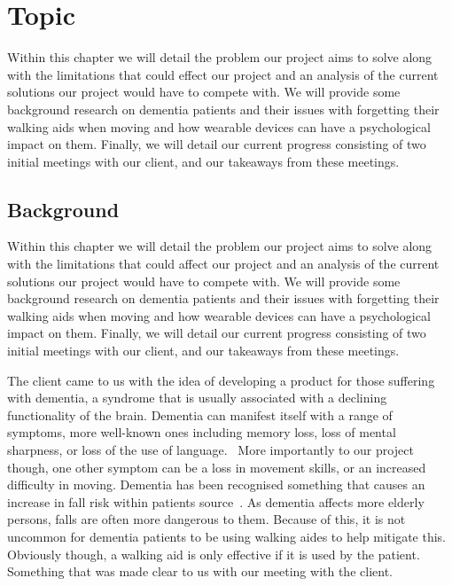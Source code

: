 \chapter{Topic} \label{ch:topic}

        Within this chapter we will detail the problem our project aims to solve along with the limitations that could
        effect our project and an analysis of the current solutions our project would have to compete with. We will
        provide some background research on dementia patients and their issues with forgetting their walking aids when
        moving and how wearable devices can have a psychological impact on them. Finally, we will detail our current
        progress consisting of two initial meetings with our client, and our takeaways from these meetings.

    \section{Background}

        Within this chapter we will detail the problem our project aims to solve along with the limitations that could
        affect our project and an analysis of the current solutions our project would have to compete with. We will
        provide some background research on dementia patients and their issues with forgetting their walking aids when
        moving and how wearable devices can have a psychological impact on them. Finally, we will detail our current
        progress consisting of two initial meetings with our client, and our takeaways from these meetings.

        The client came to us with the idea of developing a product for those suffering with dementia, a syndrome that
        is usually associated with a declining functionality of the brain. Dementia can manifest itself with a range of
        symptoms, more well-known ones including memory loss, loss of mental sharpness, or loss of the use of
        language.~\cite{nhs_choices} More importantly to our project though, one other symptom can be a loss in movement
        skills, or an increased difficulty in moving. Dementia has been recognised something that causes an increase in
        fall risk within patients
        source~\cite{doorn_gruber-baldini_zimmerman_hebel_port_baumgarten_quinn_taler_may_magaziner_et_al._2003}. As
        dementia affects more elderly persons, falls are often more dangerous to them. Because of this, it is not
        uncommon for dementia patients to be using walking aides to help mitigate this. Obviously though, a walking aid
        is only effective if it is used by the patient. Something that was made clear to us with our meeting with the
        client.


